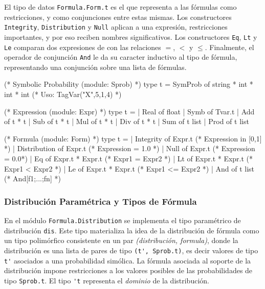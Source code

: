 El tipo de datos \verb|Formula.Form.t| es el que representa a las fórmulas como
restricciones, y como conjunciones entre estas mismas.  Los constructores
\verb|Integrity|, \verb|Distribution| y \verb|Null| aplican a una expresión,
restricciones importantes, y por eso reciben nombres significativos. Los
constructores \verb|Eq|, \verb|Lt| y \verb|Le| comparan dos expresiones de con
las relaciones $=$, $<$ y $\leq$. Finalmente, el operador de conjunción
\verb|And| le da su caracter inductivo al tipo de fórmula, representando una
conjunción sobre una lista de fórmulas.



\begin{ocamlblock}[caption={Fórmulas y sus componentes},label={lst:formula}]
  (* Symbolic Probability (module: Sprob) *)
  type t = SymProb of string * int * int * int (* Uso: TagVar("X",5,1,4) *)

  (* Expression (module: Expr) *)
  type t =
  | Real  of float  | Symb  of Tvar.t
  | Add   of t * t  | Sub   of t * t
  | Mul   of t * t  | Div   of t * t
  | Sum   of t list | Prod  of t list

  (* Formula (module: Form) *)
  type t = 
  | Integrity    of Expr.t (* Expression in [0,1] *)
  | Distribution of Expr.t (* Expression = 1.0 *)
  | Null         of Expr.t (* Expression = 0.0*)
  | Eq           of Expr.t * Expr.t (* Expr1 = Expr2 *)
  | Lt           of Expr.t * Expr.t (* Expr1 < Expr2 *)
  | Le           of Expr.t * Expr.t (* Expr1 <= Expr2 *)
  | And          of t list (* And[f1;...;fn] *)
\end{ocamlblock}





\subsubsection{Distribución Paramétrica y Tipos de Fórmula}
En el módulo \verb|Formula.Distribution| se implementa el tipo paramétrico de
distribución \verb|dis|. Este tipo materializa la idea de la distribución de fórmula como
un tipo polimórfico consistente en un par \emph{(distribución, formula)}, donde la 
distribución es una lista de pares de tipo \verb|(t', Sprob.t)|, es decir valores de
tipo \verb|t'| asociados a una probabilidad simólica. La fórmula asociada al
soporte de la distribución impone restricciones a los valores posibles de las
probabilidades de tipo \verb|Sprob.t|. El tipo \verb|'t| representa el
\emph{dominio} de la distribución.

